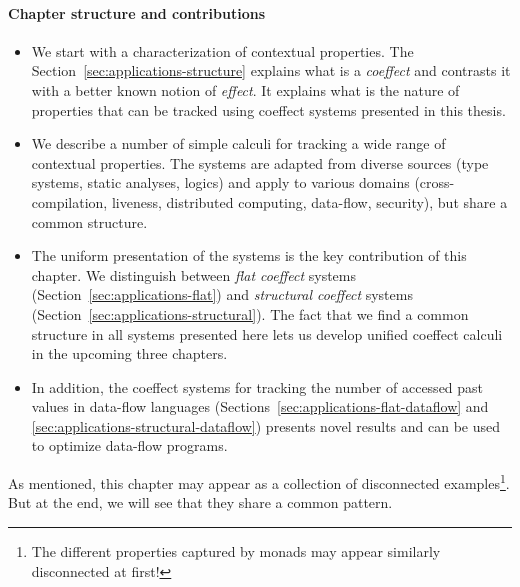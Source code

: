 \paragraph{Chapter structure and contributions}
\begin{itemize}
\item We start with a characterization of contextual properties. The Section~\ref{sec:applications-structure}
  explains what is a \emph{coeffect} and contrasts it with a better known notion of 
  \emph{effect}. It explains what is the nature of properties that can be tracked using 
  coeffect systems presented in this thesis.

\item We describe a number of simple calculi for tracking a wide range of contextual properties. 
  The systems are adapted from diverse sources (type systems, static analyses, logics) and apply to
  various domains (cross-compilation, liveness, distributed computing, data-flow, security), but
  share a common structure.

\item The uniform presentation of the systems is the key contribution of this chapter. We distinguish
  between \emph{flat coeffect} systems (Section~\ref{sec:applications-flat}) and \emph{structural coeffect}
  systems (Section~\ref{sec:applications-structural}). The fact that we find a common structure in
  all systems presented here lets us develop unified coeffect calculi in the upcoming three chapters.

\item In addition, the coeffect systems for tracking the number of accessed past values in 
  data-flow languages (Sections~\ref{sec:applications-flat-dataflow} and \ref{sec:applications-structural-dataflow})
  presents novel results and can be used to optimize data-flow programs.
\end{itemize}

\noindent
As mentioned, this chapter may appear as a collection of disconnected 
examples\footnote{The different properties captured by monads may appear similarly 
disconnected at first!}. But at the end, we will see that they share a common pattern.


%	                                                               
%

